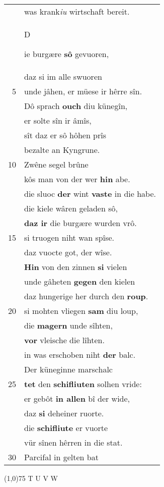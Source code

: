 \documentclass[8pt,a4paper,notitlepage]{article}
\begin{document}
\begin{table}[ht]
\begin{minipage}[t]{0.5\linewidth}
\begin{tabular}{rl}
 & was krank\textit{iu} wirtschaft bereit.\\ 
 & \begin{large}D\end{large}ie burgære \textbf{sô} gevuoren,\\ 
 & daz si im alle swuoren\\ 
5 & unde jâhen, er müese ir hêrre sîn.\\ 
 & Dô sprach \textbf{ouch} diu künegîn,\\ 
 & er solte sîn ir âmîs,\\ 
 & sît daz er sô hôhen prîs\\ 
 & bezalte an Kyngrune.\\ 
10 & Zwêne segel brûne\\ 
 & kôs man von der wer \textbf{hin} abe.\\ 
 & die sluoc \textbf{der} wint \textbf{vaste} in die habe.\\ 
 & die kiele wâren geladen sô,\\ 
 & \textbf{daz ir} die burgære wurden vrô.\\ 
15 & si truogen niht wan spîse.\\ 
 & daz vuocte got, der wîse.\\ 
 & \textbf{Hin} von den zinnen \textbf{si} vielen\\ 
 & unde gâheten \textbf{gegen} den kielen\\ 
 & daz hungerige her durch den \textbf{roup}.\\ 
20 & si mohten vliegen \textbf{sam} diu loup,\\ 
 & die \textbf{magern} unde sîhten,\\ 
 & \textbf{vor} vleische die lîhten.\\ 
 & in was erschoben niht \textbf{der} balc.\\ 
 & Der küneginne marschalc\\ 
25 & \textbf{tet} den \textbf{schifliuten} solhen vride:\\ 
 & er gebôt \textbf{in allen} bî der wide,\\ 
 & daz \textbf{si} deheiner ruorte.\\ 
 & die \textbf{schifliute} er vuorte\\ 
 & vür sînen hêrren in die stat.\\ 
30 & Parcifal in gelten bat\\ 
\end{tabular}
\scriptsize
\line(1,0){75} \newline
T U V W \newline

\end{minipage}
\end{table}
\end{document}

